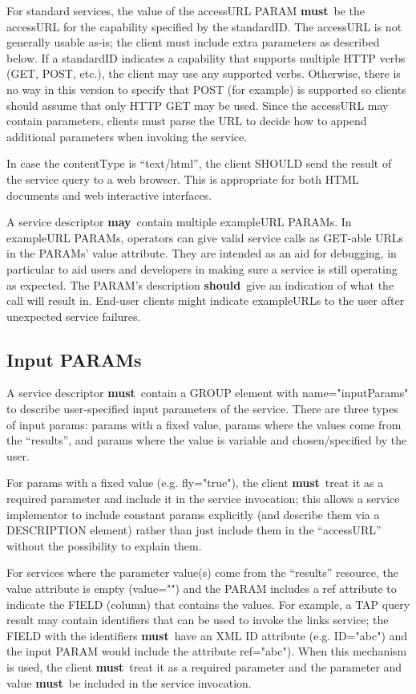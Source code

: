 \documentclass[11pt,a4paper]{ivoa}
\newcommand{\attval}[2]{#1={\allowbreak}{"}#2{"}}
\newcommand{\rfcmust}{\textbf{must}}
\newcommand{\rfcshould}{\textbf{should}}
\newcommand{\rfcmay}{\textbf{may}}
\begin{document}
For standard services, the value of the accessURL PARAM \rfcmust\ be the
accessURL for the capability specified by the standardID. The accessURL
is not generally usable as-is; the client must include extra parameters
as described below. If a standardID indicates a capability that supports
multiple HTTP verbs (GET, POST, etc.), the client may use any supported
verbs. Otherwise, there is no way in this version to specify that POST
(for example) is supported so clients should assume that only HTTP GET
may be used. Since the accessURL may contain parameters, clients must
parse the URL to decide how to append additional parameters when
invoking the service.

In case the contentType is ``text/html'', the client SHOULD send the result
of the service query to a web browser.  This is appropriate for both HTML
documents and web interactive interfaces.

A service descriptor \rfcmay\ contain multiple exampleURL PARAMs.
In exampleURL PARAMs, operators can give valid service calls as GET-able
URLs in the PARAMs' value attribute. They are intended as an aid for
debugging, in particular to aid users and developers in making sure a
service is still operating as expected. The PARAM's description \rfcshould\
give an indication of what the call will result in. End-user clients
might indicate exampleURLs to the user after unexpected service failures.

\subsection{Input PARAMs}

A service descriptor \rfcmust\ contain a GROUP element with \attval{name}{inputParams}
to describe user-specified input parameters of the service. There are three types of
input params: params with a fixed value, params where the values come from the
``results'', and params where the value is variable and chosen/specified by the user.

For params with a fixed value (e.g. \attval{fly}{true}), the client \rfcmust\
treat it as a required parameter and include it in the service invocation; this allows
a service implementor to include constant params explicitly (and describe them via a
DESCRIPTION element) rather than just include them in the ``accessURL'' without the
possibility to explain them.

For services where the parameter value(s) come from the ``results'' resource, the value
attribute is empty (\attval{value}{}) and the PARAM includes a ref attribute to indicate
the FIELD (column) that contains the values. For example, a TAP query result may contain
identifiers that can be used to invoke the {links} service; the FIELD with the identifiers
\rfcmust\ have an XML ID attribute (e.g. \attval{ID}{abc}) and the input PARAM would include
the attribute \attval{ref}{abc}). When this mechanism is used, the client \rfcmust\
treat it as a required parameter and the parameter and value \rfcmust\ be included in
the service invocation.
\end{document}

